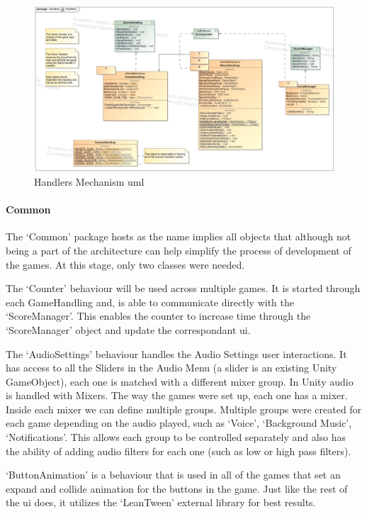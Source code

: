 \begin{figure}[H]
    \centering
    \includegraphics[width=\linewidth]{Chapters/new_architechture/class__handlers__Handlers.jpg}
    \caption{Handlers Mechanism \gls{uml}}
    \label{fig:handlers}
\end{figure}

\paragraph{Common}

The `Common' package hosts as the name implies all objects that although not being a part of the architecture can help simplify the process of development of the games. At this stage, only two classes were needed. 

The `Counter' behaviour will be used across multiple games. It is started through each GameHandling and, is able to communicate directly with the `ScoreManager'. This enables the counter to increase time through the `ScoreManager' object and update the correspondant \gls{ui}.

The `AudioSettings' behaviour handles the Audio Settings user interactions. It has access to all the Sliders in the Audio Menu (a slider is an existing Unity GameObject), each one is matched with a different mixer group. In Unity audio is handled with Mixers. The way the games were set up, each one has a mixer. Inside each mixer we can define multiple groups. Multiple groups were created for each game depending on the audio played, such as `Voice', `Background Music', `Notifications'. This allows each group to be controlled separately and also has the ability of adding audio filters for each one (such as low or high pass filters).

`ButtonAnimation' is a behaviour that is used in all of the games that set an expand and collide animation for the buttons in the game. Just like the rest of the \gls{ui} does, it utilizes the `LeanTween' external library for best results.


